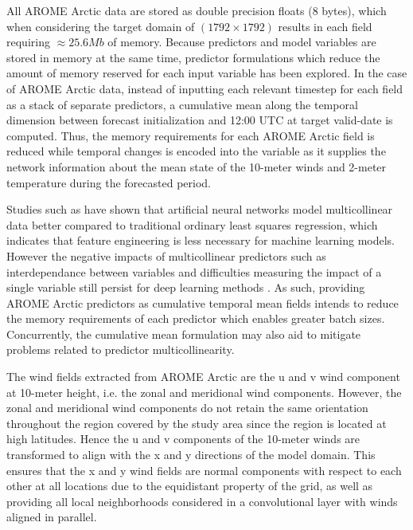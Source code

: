 \documentclass[../main/thesis]{subfiles}
\begin{document}
All AROME Arctic data are stored as double precision floats (8 bytes), which when considering the target domain of $(1792 \times 1792)$ results in each field requiring $\approx 25.6 Mb$ of memory. Because predictors and model variables are stored in memory at the same time, predictor formulations which reduce the amount of memory reserved for each input variable has been explored. In the case of AROME Arctic data, instead of inputting each relevant timestep for each field as a stack of separate predictors, a cumulative mean along the temporal dimension between forecast initialization and 12:00 UTC at target valid-date is computed. Thus, the memory requirements for each AROME Arctic field is reduced while temporal changes is encoded into the variable as it supplies the network information about the mean state of the 10-meter winds and 2-meter temperature during the forecasted period. 

Studies such as \citet{Obite2020} have shown that artificial neural networks model multicollinear data better compared to traditional ordinary least squares regression, which indicates that feature engineering is less necessary for machine learning models. However the negative impacts of multicollinear predictors such as interdependance between variables and difficulties measuring the impact of a single variable still persist for deep learning methods \citep{Chan2022}. As such, providing AROME Arctic predictors as cumulative temporal mean fields intends to reduce the memory requirements of each predictor which enables greater batch sizes. Concurrently, the cumulative mean formulation may also aid to mitigate problems related to predictor multicollinearity.

The wind fields extracted from AROME Arctic are the u and v wind component at 10-meter height, i.e. the zonal and meridional wind components. However, the zonal and meridional wind components do not retain the same orientation throughout the region covered by the study area since the region is located at high latitudes. Hence the u and v components of the 10-meter winds are transformed to align with the x and y directions of the model domain. This ensures that the x and y wind fields are normal components with respect to each other at all locations due to the equidistant property of the grid, as well as providing all local neighborhoods considered in a convolutional layer with winds aligned in parallel.
\end{document}
